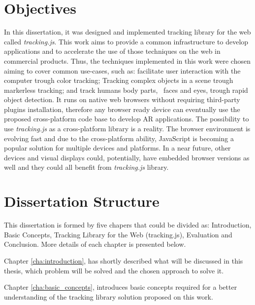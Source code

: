 
\section{Objectives} %
\label{sec:introduction:objectives}

In this dissertation, it was designed and implemented tracking library for the web called \textit{tracking.js}. This work aims to provide a common infrastructure to develop applications and to accelerate the use of those techniques on the web in commercial products. Thus, the techniques implemented in this work were chosen aiming to cover common use-cases, such as: facilitate user interaction with the computer trough color tracking; Tracking complex objects in a scene trough markerless tracking; and track humans body parts, \eg\ faces and eyes, trough rapid object detection. It runs on native web browsers without requiring third-party plugins installation, therefore any browser ready device can eventually use the proposed cross-platform code base to develop AR applications. The possibility to use \textit{tracking.js} as a cross-platform library is a reality. The browser environment is evolving fast and due to the cross-platform ability, JavaScript \cite{International2009} is becoming a popular solution for multiple devices and platforms. In a near future, other devices and visual displays could, potentially, have embedded browser versions as well and they could all benefit from \textit{tracking.js} library.


\section{Dissertation Structure} %
\label{sec:introduction:dissertation_structure}

This dissertation is formed by five chapers that could be divided as: Introduction, Basic Concepts, Tracking Library for the Web (tracking.js), Evaluation and Conclusion. More details of each chapter is presented below.

Chapter \ref{cha:introduction}, has shortly described what will be discussed in this thesis, which problem will be solved and the chosen approach to solve it.

Chapter \ref{cha:basic_concepts}, introduces basic concepts required for a better understanding of the tracking library solution proposed on this work.

